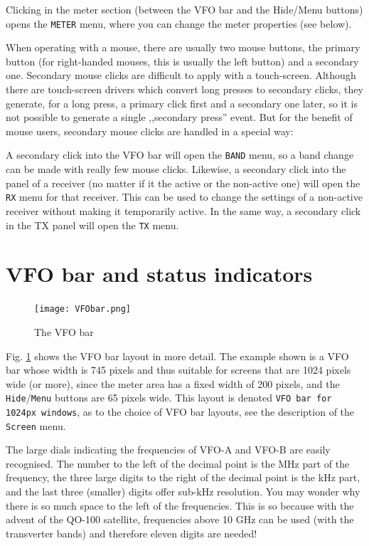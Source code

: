 \documentclass[12pt]{book}
\def\rett#1{\texttt{\color{red}#1}}
\def\bltt#1{\texttt{\color{blue}#1}}
\begin{document}
Clicking in the meter section (between the VFO bar and the
Hide/Menu buttons) opens the \bltt{METER} menu, where
you can change the meter properties (see below).

When operating with a mouse, there are usually two mouse buttons,
the primary button (for right-handed mouses, this is usually
the left button) and a secondary one. Secondary mouse clicks
are difficult to apply with a touch-screen. Although there are
touch-screen drivers which convert long presses to secondary clicks,
they generate, for a long press, a primary click first and a
secondary one later, so it is not possible to generate a
single ,,secondary press'' event. But for the benefit of
mouse users, secondary mouse clicks are handled in a special way:

A secondary click into the VFO bar will open the \bltt{BAND} menu,
so a band change can be made with really few mouse clicks. Likewise,
a secondary click into the panel of a receiver (no matter if it
the active or the non-active one) will open the \bltt{RX} menu
for that receiver. This can be used to change the settings of a
non-active receiver without making it temporarily active. In the
same way, a secondary click in the TX panel will open the
\bltt{TX} menu.

\section{VFO bar and status  indicators}
\label{sec:VFObar}
\begin{figure}[ht]
\center
\texttt{[image: VFObar.png]}
\caption{The VFO bar}
\label{fig:VFObar}
\end{figure}

Fig. \ref{fig:VFObar} shows the VFO bar layout in more  detail.
The example shown is a VFO bar whose width is 745 pixels and
thus suitable for screens that are 1024 pixels wide (or more),
since the meter area has a fixed width of 200 pixels, and
the \rett{Hide}/\rett{Menu} buttons are 65 pixels wide. This layout is
denoted \texttt{VFO bar for 1024px windows}, as to the choice
of VFO bar layouts, see the description of the \bltt{Screen} menu.

The large dials indicating the frequencies of VFO-A and VFO-B
are easily recognised. The number to the left of the decimal
point is the MHz part of the frequency, the three  large digits
to the right  of  the decimal point is the kHz part, and
the last three (smaller) digits offer sub-kHz resolution.
You may wonder why there is  so much space to the left of
the frequencies. This is so because with the advent of
the QO-100 satellite, frequencies above 10 GHz can be
used (with the transverter bands) and therefore eleven
digits are needed!
\end{document}
